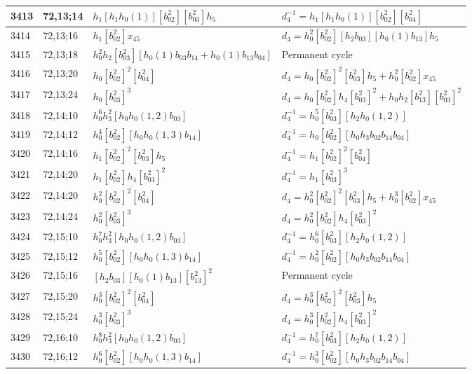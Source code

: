 \documentclass{article}
\begin{document}
\begin{longtable}{|l|l|>{\raggedright\arraybackslash}p{6cm}|>{\raggedright\arraybackslash}p{6cm}|}
\hline
3413 & 72,13;14 & $h_1[h_1h_0(1)][b_{02}^2][b_{03}^2]h_5$ & $d_{4}^{-1}=h_1[h_1h_0(1)][b_{02}^2][b_{04}^2]$\\
\hline
3414 & 72,13;16 & $h_1[b_{02}^2]x_{45}$ &$d_{4}=h_0^2[b_{02}^2][h_2b_{03}][h_0(1)b_{13}]h_5$\\
\hline
3415 & 72,13;18 & $h_0^2h_2[b_{03}^2][h_0(1)b_{03}b_{14} + h_0(1)b_{13}b_{04}]$ & Permanent cycle\\
\hline
3416 & 72,13;20 & $h_0[b_{02}^2]^2[b_{04}^2]$ &$d_{4}=h_0[b_{02}^2]^2[b_{03}^2]h_5 + h_0^2[b_{02}^2]x_{45}$\\
\hline
3417 & 72,13;24 & $h_0[b_{03}^2]^3$ &$d_{4}=h_0[b_{02}^2]h_4[b_{03}^2]^2 + h_0h_2[b_{13}^2][b_{03}^2]^2$\\
\hline
3418 & 72,14;10 & $h_0^6h_3^2[h_0h_0(1, 2)b_{03}]$ & $d_{4}^{-1}=h_0^5[b_{03}^2][h_2h_0(1, 2)]$\\
\hline
3419 & 72,14;12 & $h_0^4[b_{02}^2][h_0h_0(1, 3)b_{14}]$ & $d_{4}^{-1}=h_0[b_{02}^2][h_0h_3b_{02}b_{14}b_{04}]$\\
\hline
3420 & 72,14;16 & $h_1[b_{02}^2]^2[b_{03}^2]h_5$ & $d_{4}^{-1}=h_1[b_{02}^2]^2[b_{04}^2]$\\
\hline
3421 & 72,14;20 & $h_1[b_{02}^2]h_4[b_{03}^2]^2$ & $d_{4}^{-1}=h_1[b_{03}^2]^3$\\
3422 & 72,14;20 & $h_0^2[b_{02}^2]^2[b_{04}^2]$ &$d_{4}=h_0^2[b_{02}^2]^2[b_{03}^2]h_5 + h_0^3[b_{02}^2]x_{45}$\\
\hline
3423 & 72,14;24 & $h_0^2[b_{03}^2]^3$ &$d_{4}=h_0^2[b_{02}^2]h_4[b_{03}^2]^2$\\
\hline
3424 & 72,15;10 & $h_0^7h_3^2[h_0h_0(1, 2)b_{03}]$ & $d_{4}^{-1}=h_0^6[b_{03}^2][h_2h_0(1, 2)]$\\
\hline
3425 & 72,15;12 & $h_0^5[b_{02}^2][h_0h_0(1, 3)b_{14}]$ & $d_{4}^{-1}=h_0^2[b_{02}^2][h_0h_3b_{02}b_{14}b_{04}]$\\
\hline
3426 & 72,15;16 & $[h_2b_{03}][h_0(1)b_{13}][b_{13}^2]^2$ & Permanent cycle\\
\hline
3427 & 72,15;20 & $h_0^3[b_{02}^2]^2[b_{04}^2]$ &$d_{4}=h_0^3[b_{02}^2]^2[b_{03}^2]h_5$\\
\hline
3428 & 72,15;24 & $h_0^3[b_{03}^2]^3$ &$d_{4}=h_0^3[b_{02}^2]h_4[b_{03}^2]^2$\\
\hline
3429 & 72,16;10 & $h_0^8h_3^2[h_0h_0(1, 2)b_{03}]$ & $d_{4}^{-1}=h_0^7[b_{03}^2][h_2h_0(1, 2)]$\\
\hline
3430 & 72,16;12 & $h_0^6[b_{02}^2][h_0h_0(1, 3)b_{14}]$ & $d_{4}^{-1}=h_0^3[b_{02}^2][h_0h_3b_{02}b_{14}b_{04}]$\\

\end{longtable}
\end{document}
